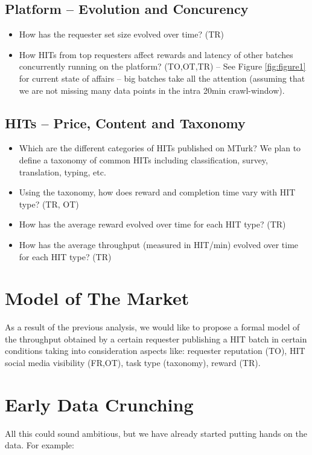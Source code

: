 \documentclass{llncs}
\begin{document}
\subsection{Platform -- Evolution and Concurency}
\begin{itemize}
	\item How has the requester set size evolved over time? (TR)
	\item How HITs from top requesters affect rewards and latency of other batches concurrently running on the platform? (TO,OT,TR)
	-- See Figure \ref{fig:figure1} for current state of affairs -- big batches take all the attention (assuming that we are not missing many data points in the intra 20min crawl-window).
\end{itemize}

\subsection{HITs -- Price, Content and Taxonomy}
\begin{itemize}
	\item Which are the different categories of HITs published on MTurk? We plan to define a taxonomy of common HITs including classification, survey, translation, typing, etc.
	\item Using the taxonomy, how does reward and completion time vary with HIT type? (TR, OT)
	\item How has the average reward evolved over time for each HIT type? (TR)
	\item How has the average throughput (measured in HIT/min) evolved over time for each HIT type? (TR)
\end{itemize}

\section{Model of The Market}
As a result of the previous analysis, we would like to propose a formal model of the throughput obtained by a certain requester publishing a HIT batch in certain conditions taking into consideration aspects like: requester reputation (TO), HIT social media visibility (FR,OT), task type (taxonomy), reward (TR).

\section{Early Data Crunching}
All this could sound ambitious, but we have already started putting hands on the data. For example:
\end{document}
